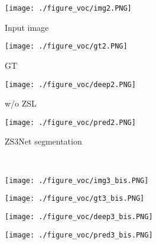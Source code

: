 \documentclass{article}
\begin{document}
\begin{figure*}
	\begin{center}
	    \begin{subfigure}[t]{0.24\textwidth}\centering 
						\caption{Input image}\vspace{-0.2cm}
			\texttt{[image: ./figure\_voc/img2.PNG]}
		\end{subfigure} 
		\begin{subfigure}[t]{0.24\textwidth}\centering
			\caption{GT}\vspace{-0.2cm}
			\texttt{[image: ./figure\_voc/gt2.PNG]}
		\end{subfigure} 
		\begin{subfigure}[t]{0.24\textwidth}\centering
			\caption{w/o ZSL}\vspace{-0.2cm}
			\texttt{[image: ./figure\_voc/deep2.PNG]}
		\end{subfigure} 
		\begin{subfigure}[t]{0.24\textwidth}\centering
		\caption{ZS3Net segmentation}\vspace{-0.2cm}
			\texttt{[image: ./figure\_voc/pred2.PNG]}
		\end{subfigure}\\ 
		\begin{subfigure}[t]{0.24\textwidth}\centering 
			\texttt{[image: ./figure\_voc/img3\_bis.PNG]}
		\end{subfigure} 
		\begin{subfigure}[t]{0.24\textwidth}\centering
			\texttt{[image: ./figure\_voc/gt3\_bis.PNG]}
		\end{subfigure} 
		\begin{subfigure}[t]{0.24\textwidth}\centering
			\texttt{[image: ./figure\_voc/deep3\_bis.PNG]}
		\end{subfigure} 
		\begin{subfigure}[t]{0.24\textwidth}\centering
			\texttt{[image: ./figure\_voc/pred3\_bis.PNG]}
		\end{subfigure}\\
		\begin{subfigure}[t]{0.24\textwidth}\centering

\end{subfigure}
\end{center}
\end{figure*}
\end{document}
